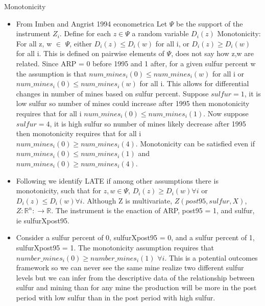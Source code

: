 \documentclass{beamer}
\begin{document}
\begin{frame}{Monotonicity}
    \begin{itemize}

    \item From Imben and Angrist 1994 econometrica Let $\Psi$ be the support of the instrument $Z_i$. Define for each $z \in \Psi$ a random variable $D_i(z)$
    Monotonicity: For all z, w $\in$ $\Psi$, either $D_i(z) \leq D_i(w)$ for all i, or $D_i(z) \geq D_i(w)$ for all i. This is defined on pairwise elements of $\Psi$, does not say how z,w are related.
    Since ARP = 0 before 1995 and 1 after, for a given sulfur percent w the assumption is that $num\_mines_i(0) \leq num\_mines_i(w)$ for all i or $num\_mines_i(0) \leq num\_mines_i(w)$ for all i. This allows for differential changes in number of mines based on sulfur percent. Suppose $sulfur= 1$, it is low sulfur so number of mines could increase after 1995 then monotonicity requires that for all i $num\_mines_i(0) \leq num\_mines_i(1)$. Now suppose $sulfur = 4$, it is high sulfur so number of mines likely decrease after 1995 then monotonicity requires that for all i $num\_mines_i(0) \geq num\_mines_i(4)$. Monotonicity can be satisfied even if $num\_mines_i(0) \leq num\_mines_i(1)$ and $num\_mines_i(0) \geq num\_mines_i(4)$.

    
        \item Following \cite{angrist1995identification} we identify LATE if among other assumptions there is monotonicity, such that for $ z,w\in \Psi$, $D_i(z)\geq D_i(w) \forall i$ or $D_i(z)\leq D_i(w) \forall i$. Although Z is multivariate, $Z(post95,sulfur, X)$, $Z:\mathbb{R}^n:\rightarrow\mathbb{R}$. The instrument is the enaction of ARP, post95 = 1, and sulfur, ie sulfurXpost95. 
        \item Consider a sulfur percent of 0, sulfurXpost95 = 0, and a sulfur percent of 1, sulfurXpost95 = 1. The monotonicity assumption requires that $number\_mines_i(0) \geq number\_mines_i(1)$ $\forall i$. This is a potential outcomes framework so we can never see the same mine realize two different sulfur levels but we can infer from the descriptive data of the relationship between sulfur and mining than for any mine the production will be more in the post period with low sulfur than in the post period with high sulfur.
    \end{itemize}
\end{frame}
\end{document}
